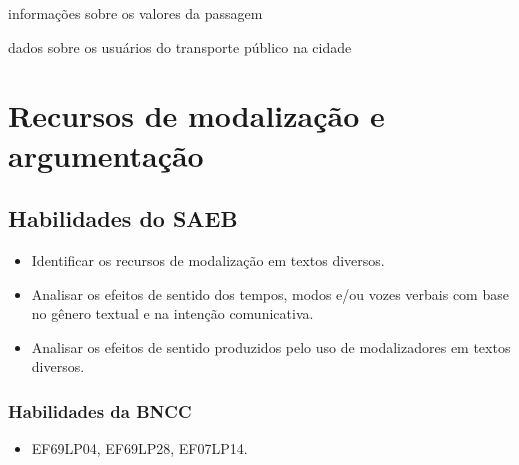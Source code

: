 {\begin{escolha}
  \item informações sobre os valores da passagem
  
  \item dados sobre os usuários do transporte público na cidade

\end{escolha}


\chapter{Recursos de modalização e argumentação}

\section{Habilidades do SAEB}

\begin{itemize}

  \item Identificar os recursos de modalização em textos diversos.

  \item Analisar os efeitos de sentido dos tempos, modos e/ou vozes 
verbais com base no gênero textual e na intenção comunicativa.

  \item Analisar os efeitos de sentido produzidos pelo uso de modalizadores em textos diversos.

\end{itemize}

\subsection{Habilidades da BNCC}

\begin{itemize}

  \item EF69LP04, EF69LP28, EF07LP14.

\end{itemize}

}
